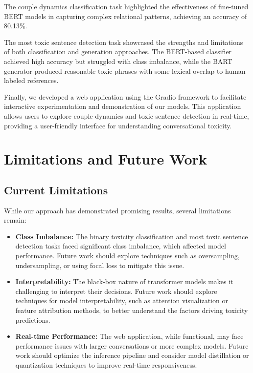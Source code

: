 \documentclass[conference]{IEEEtran}
\begin{document}
The couple dynamics classification task highlighted the effectiveness of fine-tuned BERT models in capturing complex relational patterns, achieving an accuracy of 80.13\%.

The most toxic sentence detection task showcased the strengths and limitations of both classification and generation approaches. The BERT-based classifier achieved high accuracy but struggled with class imbalance, while the BART generator produced reasonable toxic phrases with some lexical overlap to human-labeled references.

Finally, we developed a web application using the Gradio framework to facilitate interactive experimentation and demonstration of our models. This application allows users to explore couple dynamics and toxic sentence detection in real-time, providing a user-friendly interface for understanding conversational toxicity.

\section{Limitations and Future Work}

\subsection{Current Limitations}

While our approach has demonstrated promising results, several limitations remain:

\begin{itemize}
    \item \textbf{Class Imbalance:} The binary toxicity classification and most toxic sentence detection tasks faced significant class imbalance, which affected model performance. Future work should explore techniques such as oversampling, undersampling, or using focal loss to mitigate this issue.
    \item \textbf{Interpretability:} The black-box nature of transformer models makes it challenging to interpret their decisions. Future work should explore techniques for model interpretability, such as attention visualization or feature attribution methods, to better understand the factors driving toxicity predictions.
    \item \textbf{Real-time Performance:} The web application, while functional, may face performance issues with larger conversations or more complex models. Future work should optimize the inference pipeline and consider model distillation or quantization techniques to improve real-time responsiveness.
\end{itemize}
\end{document}
